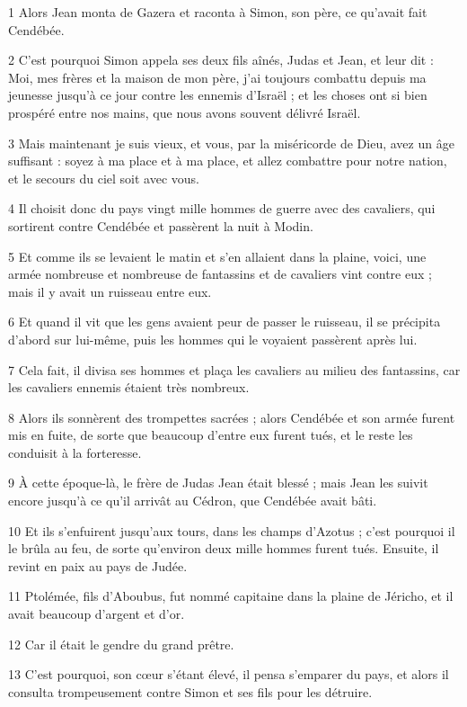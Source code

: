 \par 1 Alors Jean monta de Gazera et raconta à Simon, son père, ce qu'avait fait Cendébée.
\par 2 C'est pourquoi Simon appela ses deux fils aînés, Judas et Jean, et leur dit : Moi, mes frères et la maison de mon père, j'ai toujours combattu depuis ma jeunesse jusqu'à ce jour contre les ennemis d'Israël ; et les choses ont si bien prospéré entre nos mains, que nous avons souvent délivré Israël.
\par 3 Mais maintenant je suis vieux, et vous, par la miséricorde de Dieu, avez un âge suffisant : soyez à ma place et à ma place, et allez combattre pour notre nation, et le secours du ciel soit avec vous.
\par 4 Il choisit donc du pays vingt mille hommes de guerre avec des cavaliers, qui sortirent contre Cendébée et passèrent la nuit à Modin.
\par 5 Et comme ils se levaient le matin et s'en allaient dans la plaine, voici, une armée nombreuse et nombreuse de fantassins et de cavaliers vint contre eux ; mais il y avait un ruisseau entre eux.
\par 6 Et quand il vit que les gens avaient peur de passer le ruisseau, il se précipita d'abord sur lui-même, puis les hommes qui le voyaient passèrent après lui.
\par 7 Cela fait, il divisa ses hommes et plaça les cavaliers au milieu des fantassins, car les cavaliers ennemis étaient très nombreux.
\par 8 Alors ils sonnèrent des trompettes sacrées ; alors Cendébée et son armée furent mis en fuite, de sorte que beaucoup d'entre eux furent tués, et le reste les conduisit à la forteresse.
\par 9 À cette époque-là, le frère de Judas Jean était blessé ; mais Jean les suivit encore jusqu'à ce qu'il arrivât au Cédron, que Cendébée avait bâti.
\par 10 Et ils s'enfuirent jusqu'aux tours, dans les champs d'Azotus ; c'est pourquoi il le brûla au feu, de sorte qu'environ deux mille hommes furent tués. Ensuite, il revint en paix au pays de Judée.
\par 11 Ptolémée, fils d'Aboubus, fut nommé capitaine dans la plaine de Jéricho, et il avait beaucoup d'argent et d'or.
\par 12 Car il était le gendre du grand prêtre.
\par 13 C'est pourquoi, son cœur s'étant élevé, il pensa s'emparer du pays, et alors il consulta trompeusement contre Simon et ses fils pour les détruire.

